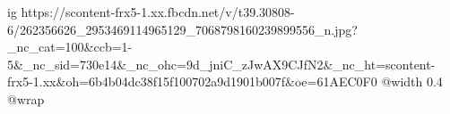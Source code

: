  
 
 
 
 

\ifcmt
  ig https://scontent-frx5-1.xx.fbcdn.net/v/t39.30808-6/262356626_2953469114965129_7068798160239899556_n.jpg?_nc_cat=100&ccb=1-5&_nc_sid=730e14&_nc_ohc=9d_jniC_zJwAX9CJfN2&_nc_ht=scontent-frx5-1.xx&oh=6b4b04dc38f15f100702a9d1901b007f&oe=61AEC0F0
  @width 0.4
  @wrap 
\fi
